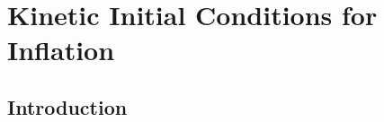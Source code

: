 \chapter{Kinetic Initial Conditions for Inflation}
\label{chap:ic}

\section{Introduction}
\label{sec:ic:intro}
